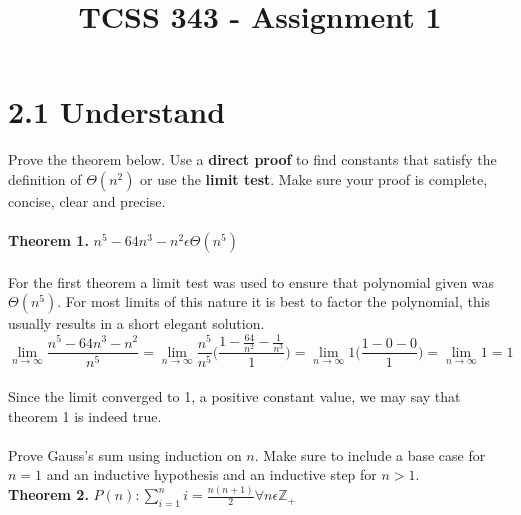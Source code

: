 \documentclass[12pt]{article}
\begin{document}
\title{TCSS 343 - Assignment 1}
\maketitle


\section{2.1 Understand}

Prove the theorem below. 
Use a \textbf{direct proof} to find constants that satisfy the definition of \begin{math}\Theta(n^2)\end{math} or use the \textbf{limit test}.  
Make sure your proof is complete, concise, clear and precise.
\\\\\textbf{Theorem 1.} 
\begin{math}n^5-64n^3-n^2 \epsilon \Theta(n^5)\end{math}
\\\\For the first theorem a limit test was used to ensure that polynomial given was \begin{math}\Theta(n^5)\end{math}. For most limits of 
this nature it is best to factor the polynomial, this usually results in a short elegant solution. 
\[ \lim_{n \to \infty}  \frac{n^5-64n^3-n^2}{n^5} = \lim_{n \to \infty} \frac{n^5}{n^5}\Bigg(\frac{1-\frac{64}{n^2}-\frac{1}{n^3}}{1}\Bigg) = \lim_{n \to \infty} 1\Bigg(\frac{1-0-0}{1}\Bigg) = \lim_{n \to \infty} 1 = 1\]
\\Since the limit converged to 1, a positive constant value, we may say that theorem 1 is indeed true.\\\\


\noindent Prove Gauss’s sum using induction on \begin{math}n\end{math}. Make sure to include a base case for \begin{math} n = 1\end{math} and an inductive hypothesis and an inductive step for \begin{math}n > 1\end{math}.\\

\noindent \textbf{Theorem 2.}
\begin{math}P(n):\sum\limits_{i = 1}^{n} i = \frac{n(n + 1)}{2} \forall n \epsilon \mathbb{Z}_+  \end{math}\\
\end{document}
